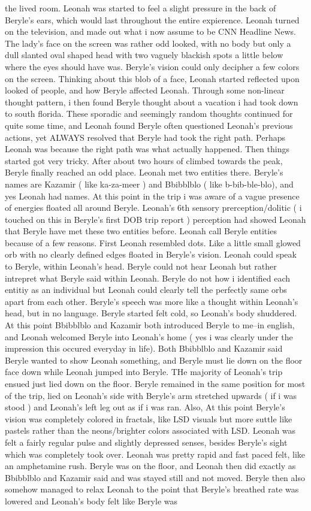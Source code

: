 \documentclass[12pt]{book}
\begin{document}
the lived room. Leonah was started to feel a slight pressure in the back of Beryle's ears, which would last throughout the entire expierence. Leonah turned on the television, and made out what i now assume to be CNN Headline News. The lady's face on the screen was rather odd looked, with no body but only a dull slanted oval shaped head with two vaguely blackish spots a little below where the eyes should have was. Beryle's vision could only decipher a few colors on the screen. Thinking about this blob of a face, Leonah started reflected upon looked of people, and how Beryle affected Leonah. Through some non-linear thought pattern, i then found Beryle thought about a vacation i had took down to south florida. These sporadic and seemingly random thoughts continued for quite some time, and Leonah found Beryle often questioned Leonah's previous actions, yet ALWAYS resolved that Beryle had took the right path. Perhaps Leonah was because the right path was what actually happened. Then things started got very tricky. After about two hours of climbed towards the peak, Beryle finally reached an odd place. Leonah met two entities there. Beryle's names are Kazamir ( like ka-za-meer ) and Bbibblblo ( like b-bib-ble-blo), and yes Leonah had names. At this point in the trip i was aware of a vague presence of energies floated all around Beryle. Leonah's 6th sensory prerception/dolitic ( i touched on this in Beryle's first DOB trip report ) perception had showed Leonah that Beryle have met these two entities before. Leonah call Beryle entities because of a few reasons. First Leonah resembled dots. Like a little small glowed orb with no clearly defined edges floated in Beryle's vision. Leonah could speak to Beryle, within Leonah's head. Beryle could not hear Leonah but rather intrepret what Beryle said within Leonah. Beryle do not how i identified each entitiy as an individual but Leonah could clearly tell the perfectly same orbs apart from each other. Beryle's speech was more like a thought within Leonah's head, but in no language. Beryle started felt cold, so Leonah's body shuddered. At this point Bbibblblo and Kazamir both introduced Beryle to me--in english, and Leonah welcomed Beryle into Leonah's home ( yes i was clearly under the impression this occured everyday in life). Both Bbibblblo and Kazamir said Beryle wanted to show Leonah something, and Beryle must lie down on the floor face down while Leonah jumped into Beryle. THe majority of Leonah's trip ensued just lied down on the floor. Beryle remained in the same position for most of the trip, lied on Leonah's side with Beryle's arm stretched upwards ( if i was stood ) and Leonah's left leg out as if i was ran. Also, At this point Beryle's vision was completely colored in fractals, like LSD visuals but more suttle like pastels rather than the neons/brighter colors associated with LSD. Leonah was felt a fairly regular pulse and slightly depressed senses, besides Beryle's sight which was completely took over. Leonah was pretty rapid and fast paced felt, like an amphetamine rush. Beryle was on the floor, and Leonah then did exactly as Bbibblblo and Kazamir said and was stayed still and not moved. Beryle then also somehow managed to relax Leonah to the point that Beryle's breathed rate was lowered and Leonah's body felt like Beryle was 
\end{document}
